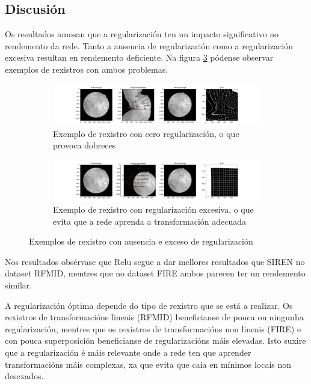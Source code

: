 
\subsection{Discusión}
\label{subsec:Discusion-regularization}

Os resultados amosan que a regularización ten un impacto significativo no rendemento da rede. Tanto a ausencia de regularización como a regularización excesiva resultan en rendemento deficiente.
Na figura \ref{fig:regularization_examples} pódense observar exemplos de rexistros con ambos problemas.

\begin{figure}[tbp]
    \centering
    \begin{subfigure}[b]{0.45\textwidth}
        \centering
        \includegraphics[width=\textwidth]{imaxes/reg_examples/no_reg_example.png}
        \caption{Exemplo de rexistro con cero regularización, o que provoca dobreces}
        \label{fig:no_reg_example}
    \end{subfigure}\hfill
    \begin{subfigure}[b]{0.45\textwidth}
        \centering
        \includegraphics[width=\textwidth]{imaxes/reg_examples/too_much_reg_example.png}
        \caption{Exemplo de rexistro con regularización excesiva, o que evita que a rede aprenda a transformación adecuada}
        \label{fig:too_much_reg_example}
    \end{subfigure}
    \caption{Exemplos de rexistro con ausencia e exceso de regularización}
    \label{fig:regularization_examples}
\end{figure}

Nos resultados obsérvase que Relu segue a dar mellores resultados que SIREN no dataset RFMID, mentres que no dataset FIRE ambos parecen ter un rendemento similar.

A regularización óptima depende do tipo de rexistro que se está a realizar. Os rexistros de transformacións lineais (RFMID) beneficianse de pouca ou ningunha regularización, mentres que os rexistros de transformacións non lineais (FIRE) e con pouca superposición beneficianse de regularizacións máis elevadas.
Isto suxire que a regularización é máis relevante onde a rede ten que aprender transformacións máis complexas, xa que evita que caia en mínimos locais non desexados.

